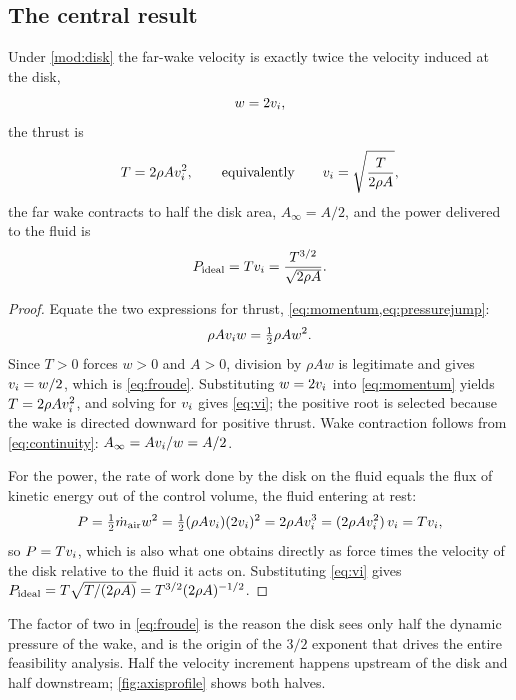 \subsection{The central result}

\begin{theorem}
\label{thm:momentum}
Under \cref{mod:disk} the far-wake velocity is exactly twice the velocity
induced at the disk,
\begin{equation}
  w = 2v_i ,
  \label{eq:froude}
\end{equation}
the thrust is
\begin{equation}
  T = 2\rho A v_i^2 ,
  \qquad\text{equivalently}\qquad
  v_i = \sqrt{\frac{T}{2\rho A}} ,
  \label{eq:vi}
\end{equation}
the far wake contracts to half the disk area, $A_\infty = A/2$, and the power
delivered to the fluid is
\begin{equation}
  P_{\mathrm{ideal}} = Tv_i = \frac{T^{3/2}}{\sqrt{2\rho A}} .
  \label{eq:pideal}
\end{equation}
\end{theorem}

\begin{proof}
Equate the two expressions for thrust, \cref{eq:momentum,eq:pressurejump}:
\[
  \rho A v_i w = \tfrac12 \rho A w^2 .
\]
Since $T>0$ forces $w>0$ and $A>0$, division by $\rho A w$ is legitimate and
gives $v_i = w/2$, which is \cref{eq:froude}. Substituting $w = 2v_i$ into
\cref{eq:momentum} yields $T = 2\rho A v_i^2$, and solving for $v_i$ gives
\cref{eq:vi}; the positive root is selected because the wake is directed
downward for positive thrust. Wake contraction follows from
\cref{eq:continuity}: $A_\infty = Av_i/w = A/2$.

For the power, the rate of work done by the disk on the fluid equals the flux
of kinetic energy out of the control volume, the fluid entering at rest:
\[
  P = \tfrac12 \dot m_{\mathrm{air}} w^2
    = \tfrac12 (\rho A v_i)(2v_i)^2
    = 2\rho A v_i^3
    = (2\rho A v_i^2)\,v_i = Tv_i ,
\]
so $P = Tv_i$, which is also what one obtains directly as force times the
velocity of the disk relative to the fluid it acts on. Substituting
\cref{eq:vi} gives $P_{\mathrm{ideal}} = T\sqrt{T/(2\rho A)} = T^{3/2}(2\rho A)^{-1/2}$.
\end{proof}

\begin{remark}
The factor of two in \cref{eq:froude} is the reason the disk sees only half the
dynamic pressure of the wake, and is the origin of the $3/2$ exponent that
drives the entire feasibility analysis. Half the velocity increment happens
upstream of the disk and half downstream; \cref{fig:axisprofile} shows both
halves.
\end{remark}

